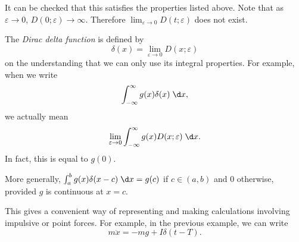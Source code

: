 \documentclass[a4paper]{article}
\begin{document}
It can be checked that this satisfies the properties listed above. Note that as $\varepsilon \to 0$, $D(0; \varepsilon)\to \infty$. Therefore $\displaystyle \lim_{\varepsilon\to 0} D(t; \varepsilon)$ does not exist.

\begin{defi}
  The \emph{Dirac delta function} is defined by
  \[
    \delta(x) = \lim_{\varepsilon \to 0} D(x; \varepsilon)
  \]
  on the understanding that we can only use its integral properties. For example, when we write
  \[
    \int_{-\infty}^{\infty} g(x)\delta (x) \;\d x,
  \]
  we actually mean
  \[
    \lim_{\varepsilon \to 0} \int_{-\infty}^{\infty} g(x)D(x; \varepsilon)\;\d x.
  \]
  In fact, this is equal to $g(0)$.

  More generally, $\int_a^b g(x)\delta(x - c)\;\d x = g(c)$ if $c\in (a, b)$ and $0$ otherwise, provided $g$ is continuous at $x = c$.
\end{defi}

This gives a convenient way of representing and making calculations involving impulsive or point forces. For example, in the previous example, we can write
\[
  m\ddot x = -mg + I\delta(t - T).
\]
\end{document}

